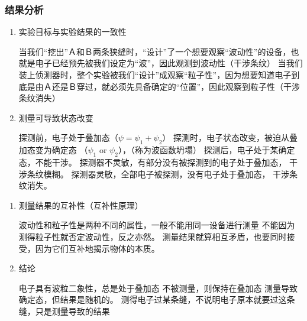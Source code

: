  \begin{frame} 
     \frametitle{结果分析}
     \begin{enumerate}
          \item 实验目标与实验结果的一致性\\
         \begin{itemize}
             \IItem 当我们“挖出”Ａ和Ｂ两条狭缝时，“设计”了一个想要观察“波动性”的设备，也就是电子已经预先被我们设定为“波”，因此观测到波动性（干涉条纹）
             \IItem 当我们装上侦测器时，整个实验被我们“设计”成观察“粒子性”，因为想要知道电子到底是由Ａ还是Ｂ穿过，就必须先具备确定的“位置”，因此观察到粒子性（干涉条纹消失）
         \end{itemize}
          \item 测量可导致状态改变\\
         \begin{itemize}
             \IItem 探测前，电子处于叠加态（$ \psi =\psi_1+\psi_2$）
             \IItem 探测时，电子状态改变，被迫从叠加态变为确定态 （$\psi_1$ or $\psi_2$），（称为波函数坍塌）
             \IItem 探测后，电子处于某确定态，不能干涉。
             \IItem 探测器不灵敏，有部分没有被探测到的电子处于叠加态， 干涉条纹模糊。
             \IItem 探测器灵敏，全部电子被探测，没有电子处于叠加态， 干涉条纹消失。
         \end{itemize}
     \end{enumerate}
 \end{frame}
 
 \begin{frame}   
     \begin{enumerate}
          \item 测量结果的互补性（互补性原理）\\
         \begin{itemize}
             \IItem 波动性和粒子性是两种不同的属性，一般不能用同一设备进行测量
             \IItem 不能因为测得粒子性就否定波动性，反之亦然。
             \IItem 测量结果就算相互矛盾，也要同时接受，因为它们互补地揭示物体的本质。
         \end{itemize}
          \item 结论
         \begin{itemize}
             \IItem 电子具有波粒二象性，总是处于叠加态
             \IItem 不被测量，则保持在叠加态
             \IItem 测量导致确定态，但结果是随机的。
             \IItem 测得电子过某条缝，不说明电子原本就要过这条缝，只是测量导致的结果
         \end{itemize}
     \end{enumerate}
 \end{frame}
 
